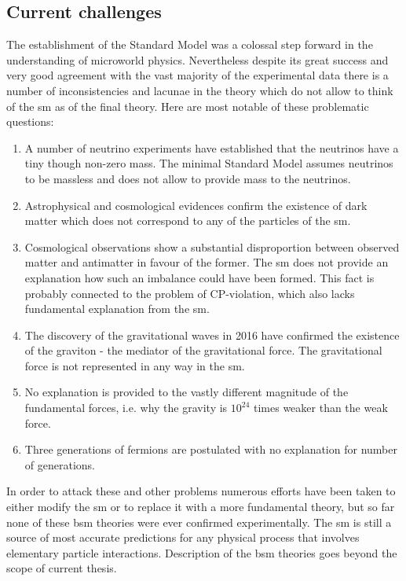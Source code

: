 \subsection*{Current challenges}

The establishment of the Standard Model was a colossal step forward in the understanding of microworld physics. Nevertheless despite its great success and very good agreement with the vast majority of the experimental data there is a number of inconsistencies and lacunae in the theory which do not allow to think of the \gls{sm} as of the final theory. Here are most notable of these problematic questions:
\begin{enumerate}
	\item A number of neutrino experiments have established that the neutrinos have a tiny though non-zero mass. The minimal Standard Model assumes neutrinos to be massless and does not allow to provide mass to the neutrinos. 
	\item Astrophysical and cosmological evidences confirm the existence of dark matter which does not correspond to any of the particles of the \gls{sm}. 
	\item Cosmological observations show a substantial disproportion between observed matter and antimatter in favour of the former. The \gls{sm} does not provide an explanation how such an imbalance could have been formed. This fact is probably connected to the problem of CP-violation, which also lacks fundamental explanation from the \gls{sm}.
	\item The discovery of the gravitational waves in 2016 have confirmed the existence of the graviton - the mediator of the gravitational force. The gravitational force is not represented in any way in the \gls{sm}.
	\item No explanation is provided to the vastly different magnitude of the fundamental forces, i.e. why the gravity is $10^{24}$ times weaker than the weak force. 
	\item Three generations of fermions are postulated with no explanation for number of generations. 
\end{enumerate}

In order to attack these and other problems numerous efforts have been taken to either modify the \gls{sm} or to replace it with a more fundamental theory, but so far none of these \gls{bsm} theories were ever confirmed experimentally. The \gls{sm} is still a source of most accurate predictions for any physical process that involves elementary particle interactions. Description of the \gls{bsm} theories goes beyond the scope of current thesis. 

